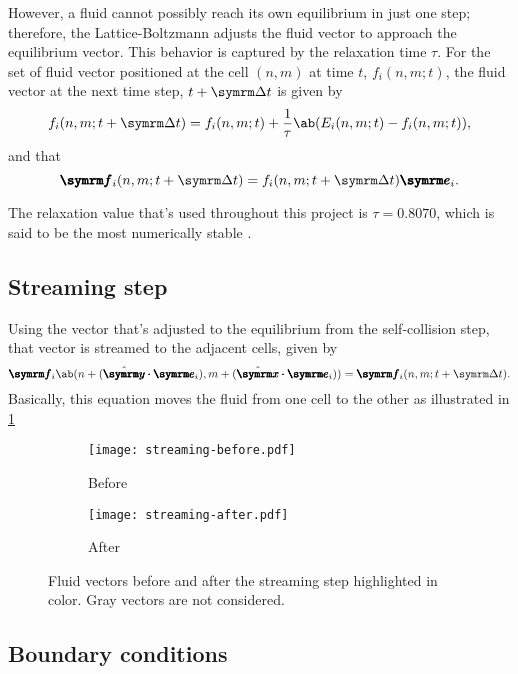 However, a fluid cannot possibly reach its own equilibrium in just one step; therefore, the Lattice-Boltzmann adjusts the fluid vector to approach the equilibrium vector. This behavior is captured by the relaxation time $\tau$. For the set of fluid vector positioned at the cell $(n, m)$ at time $t$, $f_i(n, m; t)$, the fluid vector at the next time step, $t + \Dd{t}$ is given by
\begin{equation}
	f_i(n, m; t + \Dd{t}) = f_i(n, m; t) + \frac{1}{\tau}\ab(E_i(n, m; t) - f_i(n, m; t)),
\end{equation}
and that
\begin{equation}
	\vv{f}_i(n, m; t + \Dd{t}) = f_i(n, m; t + \Dd{t})\vv{e}_i.
\end{equation}

The relaxation value that's used throughout this project is $\tau = 0.8070$, which is said to be the most numerically stable \cite{zhao-2013}.

\subsection{Streaming step}

Using the vector that's adjusted to the equilibrium from the self-collision step, that vector is streamed to the adjacent cells, given by
\begin{equation}
	\vv{f}_i\ab(n + (\yhat \vdot \vv{e}_i), m + (\xhat \vdot \vv{e}_i)) = \vv{f}_i(n, m; t + \Dd{t}).
\end{equation}
Basically, this equation moves the fluid from one cell to the other as illustrated in \cref{fig:streaming-step}
\begin{figure}
	\centering
	\begin{subfigure}{0.45\textwidth}
		\centering
		\texttt{[image: streaming-before.pdf]}
		\caption{Before}
	\end{subfigure}
	\begin{subfigure}{0.45\textwidth}
		\centering
		\texttt{[image: streaming-after.pdf]}
		\caption{After}
	\end{subfigure}
	\caption{Fluid vectors before and after the streaming step highlighted in color. Gray vectors are not considered.}
	\label{fig:streaming-step}
\end{figure}

\subsection{Boundary conditions}

